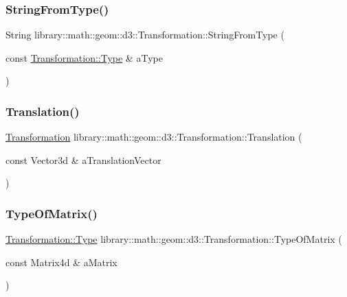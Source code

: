 \subsubsection{\texorpdfstring{String\+From\+Type()}{StringFromType()}}
{\footnotesize\ttfamily String library\+::math\+::geom\+::d3\+::\+Transformation\+::\+String\+From\+Type (\begin{DoxyParamCaption}\item[{const \hyperlink{classlibrary_1_1math_1_1geom_1_1d3_1_1_transformation_a25f1dc99d391174bf82a7132d08b2fc1}{Transformation\+::\+Type} \&}]{a\+Type }\end{DoxyParamCaption})\hspace{0.3cm}{\ttfamily [static]}}

\mbox{\label{classlibrary_1_1math_1_1geom_1_1d3_1_1_transformation_a5f781ba4e25ce79a02afccbe94a1ab0a}} 
\subsubsection{\texorpdfstring{Translation()}{Translation()}}
{\footnotesize\ttfamily \hyperlink{classlibrary_1_1math_1_1geom_1_1d3_1_1_transformation}{Transformation} library\+::math\+::geom\+::d3\+::\+Transformation\+::\+Translation (\begin{DoxyParamCaption}\item[{const Vector3d \&}]{a\+Translation\+Vector }\end{DoxyParamCaption})\hspace{0.3cm}{\ttfamily [static]}}

\mbox{\label{classlibrary_1_1math_1_1geom_1_1d3_1_1_transformation_aa532f2c9f56ee5aff63417283a930584}} 
\subsubsection{\texorpdfstring{Type\+Of\+Matrix()}{TypeOfMatrix()}}
{\footnotesize\ttfamily \hyperlink{classlibrary_1_1math_1_1geom_1_1d3_1_1_transformation_a25f1dc99d391174bf82a7132d08b2fc1}{Transformation\+::\+Type} library\+::math\+::geom\+::d3\+::\+Transformation\+::\+Type\+Of\+Matrix (\begin{DoxyParamCaption}\item[{const Matrix4d \&}]{a\+Matrix }\end{DoxyParamCaption})\hspace{0.3cm}{\ttfamily [static]}}

